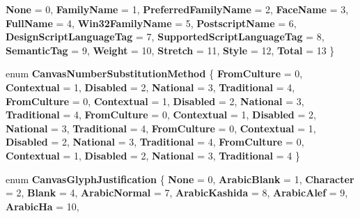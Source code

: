 \begin{DoxyCompactItemize}
{\bfseries None} = 0, 
{\bfseries Family\+Name} = 1, 
{\bfseries Preferred\+Family\+Name} = 2, 
{\bfseries Face\+Name} = 3, 
\newline
{\bfseries Full\+Name} = 4, 
{\bfseries Win32\+Family\+Name} = 5, 
{\bfseries Postscript\+Name} = 6, 
{\bfseries Design\+Script\+Language\+Tag} = 7, 
\newline
{\bfseries Supported\+Script\+Language\+Tag} = 8, 
{\bfseries Semantic\+Tag} = 9, 
{\bfseries Weight} = 10, 
{\bfseries Stretch} = 11, 
\newline
{\bfseries Style} = 12, 
{\bfseries Total} = 13
 \}
\item 
\mbox{\label{namespace_microsoft_1_1_graphics_1_1_canvas_1_1_text_a1b27923c53dacedc3dd21565fd3939d0}} 
enum {\bfseries Canvas\+Number\+Substitution\+Method} \{ \newline
{\bfseries From\+Culture} = 0, 
{\bfseries Contextual} = 1, 
{\bfseries Disabled} = 2, 
{\bfseries National} = 3, 
\newline
{\bfseries Traditional} = 4, 
{\bfseries From\+Culture} = 0, 
{\bfseries Contextual} = 1, 
{\bfseries Disabled} = 2, 
\newline
{\bfseries National} = 3, 
{\bfseries Traditional} = 4, 
{\bfseries From\+Culture} = 0, 
{\bfseries Contextual} = 1, 
\newline
{\bfseries Disabled} = 2, 
{\bfseries National} = 3, 
{\bfseries Traditional} = 4, 
{\bfseries From\+Culture} = 0, 
\newline
{\bfseries Contextual} = 1, 
{\bfseries Disabled} = 2, 
{\bfseries National} = 3, 
{\bfseries Traditional} = 4, 
\newline
{\bfseries From\+Culture} = 0, 
{\bfseries Contextual} = 1, 
{\bfseries Disabled} = 2, 
{\bfseries National} = 3, 
\newline
{\bfseries Traditional} = 4
 \}
\item 
\mbox{\label{namespace_microsoft_1_1_graphics_1_1_canvas_1_1_text_acba5660b438dcb959c71962388688034}} 
enum {\bfseries Canvas\+Glyph\+Justification} \{ \newline
{\bfseries None} = 0, 
{\bfseries Arabic\+Blank} = 1, 
{\bfseries Character} = 2, 
{\bfseries Blank} = 4, 
\newline
{\bfseries Arabic\+Normal} = 7, 
{\bfseries Arabic\+Kashida} = 8, 
{\bfseries Arabic\+Alef} = 9, 
{\bfseries Arabic\+Ha} = 10, 

\end{DoxyCompactItemize}
